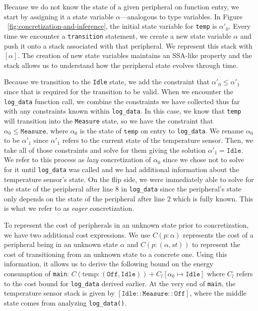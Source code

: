 \documentclass[sigconf, nonacm, screen]{acmart}
\begin{document}
Because we do not know the state of a given peripheral on function entry, we start by assigning it a state variable $\alpha$---analogous to type variables. In Figure ~\ref{fig:concretization-and-inference}, the initial state variable for \texttt{temp} is $\alpha'_0$.  Every time we encounter a \texttt{transition} statement, we create a new state variable $\alpha$ and push it onto a stack associated with that peripheral. We represent this stack with $[\alpha]$. The creation of new state variables maintains an SSA-like property and the stack allows us to understand how the peripheral state evolves through time.

Because we transition to the \texttt{Idle} state, we add the constraint that $\alpha'_0 \leq \alpha'_1$ since that is required for the transition to be valid. When we encounter the \texttt{log\_data} function call, we combine the constraints we have collected thus far with any constraints known within \texttt{log\_data}. In this case, we know that \texttt{temp} will transition into the \texttt{Measure} state, so we have the constraint that $\alpha_0 \leq \texttt{Measure}$, where $\alpha_0$ is the state of $\texttt{temp}$ on entry to \texttt{log\_data}. We rename $\alpha_0$ to be $\alpha'_1$ since $\alpha'_1$ refers to the current state of the temperature sensor. Then, we take all of those constraints and solve for them giving the solution $\alpha'_1 = \texttt{Idle}$. We refer to this process as \textit{lazy} concretization of $\alpha_0$ since we chose not to solve for it until \texttt{log\_data} was called and we had additional information about the temperature sensor's state. On the flip side, we were immediately able to solve for the state of the peripheral after line 8 in \texttt{log\_data} since the peripheral's state only depends on the state of the peripheral after line 2 which is fully known. This is what we refer to as \textit{eager} concretization.

To represent the cost of peripherals in an unknown state prior to concretization, we have two additional cost expressions. We use $C(p : \alpha)$ represents the cost of a peripheral being in an unknown state $\alpha$ and $C(p : (\alpha, st))$ to represent the cost of transitioning from an unknown state to a concrete one. Using this information, it allows us to derive the following bound on the energy consumption of \texttt{main}: $C(\text{temp}: (\texttt{Off}, \texttt{Idle})) + C_l[\alpha_0 \mapsto \texttt{Idle}]$ where $C_l$ refers to the cost bound for \texttt{log\_data} derived earlier. At the very end of \texttt{main}, the temperature sensor stack is given by $[\texttt{Idle} :: \texttt{Measure} :: \texttt{Off}]$, where the middle state comes from analyzing \texttt{log\_data()}.
\end{document}

